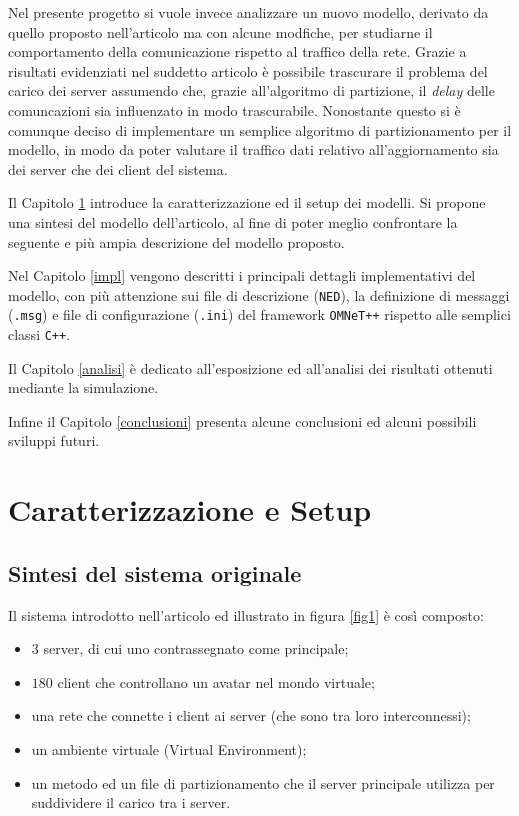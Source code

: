 \documentclass[a4paper, 11pt, oneside]{book}
\theoremstyle{definition}
\theoremstyle{remark}
\begin{document}
Nel presente progetto si vuole invece analizzare un nuovo modello, derivato
da quello proposto nell'articolo ma con alcune modfiche, per studiarne il
comportamento della comunicazione rispetto al traffico della rete.
Grazie a risultati evidenziati nel suddetto articolo è possibile trascurare
il problema del carico dei server assumendo che, grazie all'algoritmo di
partizione, il \emph{delay} delle comuncazioni sia influenzato in modo
trascurabile. Nonostante questo si è comunque deciso di implementare un
semplice algoritmo di partizionamento per il modello, in modo da poter valutare
il traffico dati relativo all'aggiornamento sia dei server che dei client
del sistema.

Il Capitolo \ref{setup} introduce la caratterizzazione ed il setup dei
modelli. Si propone una sintesi del modello dell'articolo, al fine di poter
meglio confrontare la seguente e più ampia descrizione del modello proposto.

Nel Capitolo \ref{impl} vengono descritti i principali dettagli implementativi
del modello, con più attenzione sui file di descrizione (\texttt{NED}),
la definizione di messaggi (\texttt{.msg}) e file di configurazione
(\texttt{.ini}) del framework \texttt{OMNeT++} rispetto alle semplici classi
\texttt{C++}.

Il Capitolo \ref{analisi} è dedicato all'esposizione ed all'analisi dei
risultati ottenuti mediante la simulazione.

Infine il Capitolo \ref{conclusioni} presenta alcune conclusioni ed alcuni
possibili sviluppi futuri.


\chapter{Caratterizzazione e Setup}\label{setup}
\section{Sintesi del sistema originale}\label{modello_orig}
Il sistema introdotto nell'articolo ed illustrato in figura \ref{fig1}
è così composto:
\begin{itemize}
\item
$3$ server, di cui uno contrassegnato come principale;
\item
$180$ client che controllano un avatar nel mondo virtuale;
\item
una rete che connette i client ai server (che sono tra loro interconnessi);
\item
un ambiente virtuale (Virtual Environment);
\item
un metodo ed un file di partizionamento che il server principale utilizza per
suddividere il carico tra i server.
\end{itemize}
\end{document}
